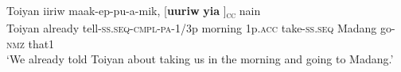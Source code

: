 \ea%
\label{ex:8:x1848}
\gll Toiyan  iiriw  maak-ep-pu-a-mik, [\textbf{uuriw} \textbf{yia}    ]\textsubscript{\textsc{cc}} nain\\
Toiyan  already  tell-\textsc{ss}.\textsc{seq}-\textsc{cmpl}-\textsc{pa}-1/3p morning 1p.\textsc{acc} take-\textsc{ss}.\textsc{seq} Madang go-\textsc{nmz} that1\\
\glt`We already told Toiyan about taking us in the morning and going to Madang.' 
\z